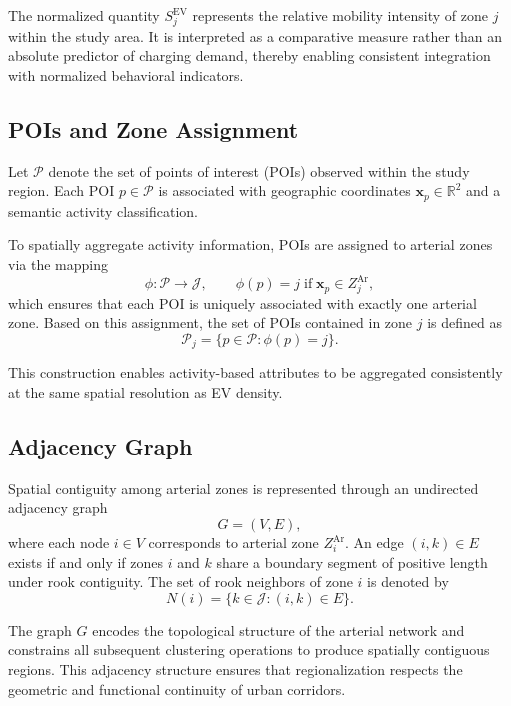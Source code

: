 \documentclass[conference]{IEEEtran}
\begin{document}
The normalized quantity $S^{\mathrm{EV}}_j$ represents the relative
mobility intensity of zone $j$ within the study area. It is interpreted
as a comparative measure rather than an absolute predictor of charging
demand, thereby enabling consistent integration with normalized
behavioral indicators.

\subsection{POIs and Zone Assignment}

Let $\mathcal{P}$ denote the set of points of interest (POIs) observed
within the study region. Each POI $p\in\mathcal{P}$ is associated with
geographic coordinates $\mathbf{x}_p \in \mathbb{R}^2$ and a semantic
activity classification.

To spatially aggregate activity information, POIs are assigned to
arterial zones via the mapping
\begin{equation}
\phi : \mathcal{P}\rightarrow\mathcal{J}, \qquad
\phi(p)=j \;\text{if}\; \mathbf{x}_p\in Z^{\mathrm{Ar}}_j,
\end{equation}
which ensures that each POI is uniquely associated with exactly one
arterial zone. Based on this assignment, the set of POIs contained in
zone $j$ is defined as
\begin{equation}
\mathcal{P}_j =
\{p\in\mathcal{P}:\phi(p)=j\}.
\end{equation}

This construction enables activity-based attributes to be aggregated
consistently at the same spatial resolution as EV density.

\subsection{Adjacency Graph}

Spatial contiguity among arterial zones is represented through an
undirected adjacency graph
\[
G = (V,E),
\]
where each node $i \in V$ corresponds to arterial zone
$Z^{\mathrm{Ar}}_i$. An edge $(i,k)\in E$ exists if and only if zones
$i$ and $k$ share a boundary segment of positive length under rook
contiguity.
The set of rook neighbors of zone $i$ is denoted by
\[
N(i) = \{ k \in \mathcal{J} : (i,k)\in E \}.
\]

The graph $G$ encodes the topological structure of the arterial
network and constrains all subsequent clustering operations to produce
spatially contiguous regions. This adjacency structure ensures that
regionalization respects the geometric and functional continuity of
urban corridors.%
\end{document}
